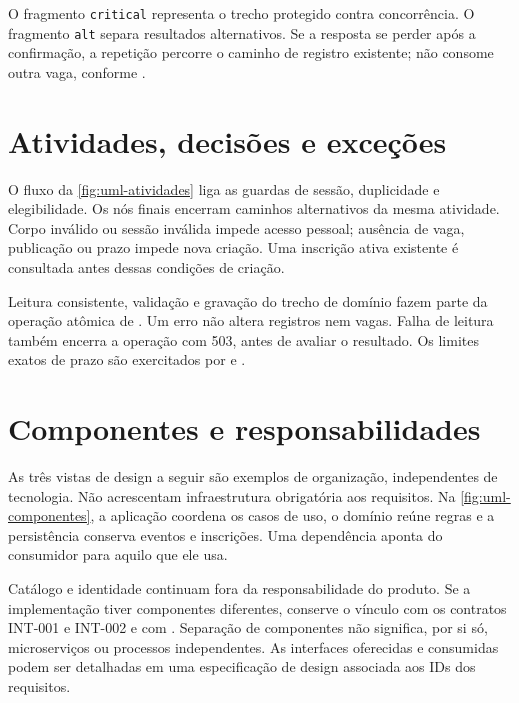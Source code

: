   {}

O fragmento \texttt{critical} representa o trecho protegido contra concorrência.
O fragmento \texttt{alt} separa resultados alternativos.
Se a resposta se perder após a confirmação, a repetição percorre o caminho
de registro existente; não consome outra vaga, conforme .

\clearpage
\section{Atividades, decisões e exceções}
O fluxo da \autoref{fig:uml-atividades} liga as guardas de sessão, duplicidade
e elegibilidade. Os nós finais encerram caminhos alternativos da mesma atividade.
Corpo inválido ou sessão inválida impede acesso pessoal; ausência de vaga,
publicação ou prazo impede nova criação. Uma inscrição ativa existente é
consultada antes dessas condições de criação.

  {}

Leitura consistente, validação e gravação do trecho de domínio fazem parte da
operação atômica de . Um erro não altera registros nem vagas.
Falha de leitura também encerra a operação com 503, antes de avaliar o resultado.
Os limites exatos de prazo são exercitados por  e .

\clearpage
\section{Componentes e responsabilidades}
As três vistas de design a seguir são exemplos de organização, independentes
de tecnologia. Não acrescentam infraestrutura obrigatória aos requisitos.
Na \autoref{fig:uml-componentes}, a aplicação coordena os casos de uso,
o domínio reúne regras e a persistência conserva eventos e inscrições.
Uma dependência aponta do consumidor para aquilo que ele usa.

  {}

Catálogo e identidade continuam fora da responsabilidade do produto.
Se a implementação tiver componentes diferentes, conserve o vínculo com os
contratos INT-001 e INT-002 e com .
Separação de componentes não significa, por si só, microserviços ou processos
independentes. As interfaces oferecidas e consumidas podem ser detalhadas em
uma especificação de design associada aos IDs dos requisitos.

